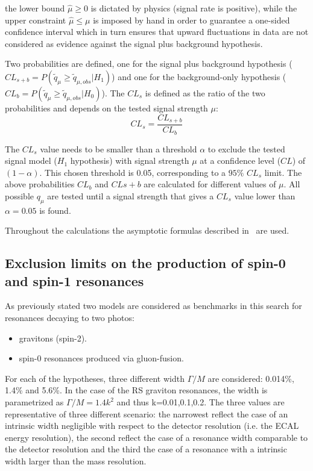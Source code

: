 the lower bound $\hat\mu \geq 0$ is  dictated  by  physics  (signal  rate  is  positive),  while
the upper constraint $\hat\mu \leq \mu$ is imposed by hand in order to guarantee a one-sided
confidence interval which in turn ensures that upward fluctuations in data are not considered as
evidence against the signal plus background hypothesis.

Two probabilities are defined, one for the signal plus background hypothesis
($CL_{s+b} = P( \tilde{q}_{\mu} \geq \tilde{q}_{\mu,obs} |H_1 )$) and
one for the background-only hypothesis ($CL_b = P( \tilde{q}_{\mu} \geq \tilde{q}_{\mu,obs} |H_0 )$). The $CL_s$ is defined
as the ratio of the two probabilities and depends on the tested signal strength $\mu$:
\[
  CL_s = \frac{CL_{s+b}}{CL_b}
\]

The $CL_s$ value needs to be smaller than a threshold $\alpha$ to exclude the tested signal model ($H_1$ hypothesis) 
with signal strength $\mu$ at a confidence level ($CL$) of $(1-\alpha)$. This chosen threshold is 0.05,
corresponding to a $95\%$ $CL_s$ limit. The above probabilities $CL_b$ and $CL{s+b}$
are calculated for different values of $\mu$. All possible $q_{\mu}$ are tested until a signal strength
that gives a $CL_s$ value lower than $\alpha = 0.05$ is found.

Throughout the calculations the asymptotic formulas described in~\cite{Cowan:2010js} are used.

\clearpage
\subsection{Exclusion limits on the production of spin-0 and spin-1 resonances}
As previously stated two models are considered as benchmarks in this search for resonances decaying to two photos:
\begin{itemize}
\item \RS gravitons (spin-2).
\item spin-0 resonances produced via gluon-fusion.
\end{itemize}

For each of the hypotheses, three different width $\Gamma / M$ are considered:
0.014\%, 1.4\% and 5.6\%. In the case of the RS graviton resonances, the width is
parametrized as $\Gamma / M = 1.4 k^2$ and thus k=0.01,0.1,0.2. The three values are representative of
three different scenario: the narrowest reflect the case of an intrinsic width negligible with respect to the
detector resolution (i.e. the ECAL energy resolution), the second reflect the case of a resonance width
comparable to the detector resolution and the third the case of a resonance with a intrinsic width larger than
the mass resolution.

